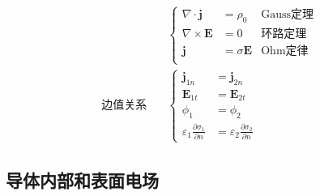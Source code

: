 \documentclass[12pt,onecolumn,a4paper]{book}
\numberwithin{table}{subsection}
\numberwithin{equation}{subsection}
\begin{document}
\begin{align}
    \quad
     & \left\{
    \begin{aligned}
        \nabla \cdot \mathbf{j}  & = \rho_0            & \text{Gauss定理} \\
        \nabla \times \mathbf{E} & = 0                 & \text{环路定理}    \\
        \mathbf{j}               & = \sigma \mathbf{E} & \text{Ohm定律}   \\
    \end{aligned}
    \right.    \\
    \text{边值关系} \quad
     & \left\{
    \begin{aligned}
        \mathbf{j}_{1n}                                   & = \mathbf{j}_{2n}                                   \\
        \mathbf{E}_{1t}                                   & = \mathbf{E}_{2t}                                   \\
        \phi_1                                            & =   \phi_2                                          \\
        \varepsilon_1\frac{\partial \sigma_1}{\partial n} & = \varepsilon_2\frac{\partial \sigma_2}{\partial n}
    \end{aligned}
    \right.
\end{align}

\subsection{导体内部和表面电场}
\end{document}
